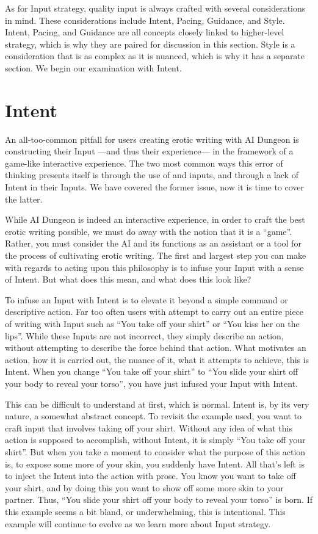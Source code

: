 \documentclass[Source-main.tex]{subfiles}
\begin{document}
As for Input strategy, quality input is always crafted with several considerations in mind.
These considerations include Intent, Pacing, Guidance, and Style.
Intent, Pacing, and Guidance are all concepts closely linked to higher-level strategy, which is why they are paired for discussion in this section.
Style is a consideration that is as complex as it is nuanced, which is why it has a separate section.
We begin our examination with Intent.

\section{Intent}

An all-too-common pitfall for users creating erotic writing with AI Dungeon is constructing their Input —and thus their experience— in the framework of a game-like interactive experience.
The two most common ways this error of thinking presents itself is through the use of  and  inputs, and through a lack of Intent in their Inputs.
We have covered the former issue, now it is time to cover the latter.

While AI Dungeon is indeed an interactive experience, in order to craft the best erotic writing possible, we must do away with the notion that it is a “game”.
Rather, you must consider the AI and its functions as an assistant or a tool for the process of cultivating erotic writing.
The first and largest step you can make with regards to acting upon this philosophy is to infuse your Input with a sense of Intent.
But what does this mean, and what does this look like?

To infuse an Input with Intent is to elevate it beyond a simple command or descriptive action.
Far too often users with attempt to carry out an entire piece of writing with Input such as “You take off your shirt” or “You kiss her on the lips”.
While these Inputs are not incorrect, they simply describe an action, without attempting to describe the force behind that action.
What motivates an action, how it is carried out, the nuance of it, what it attempts to achieve, this is Intent.
When you change “You take off your shirt” to “You slide your shirt off your body to reveal your torso”, you have just infused your Input with Intent.

This can be difficult to understand at first, which is normal.
Intent is, by its very nature, a somewhat abstract concept.
To revisit the example used, you want to craft input that involves taking off your shirt.
Without any idea of what this action is supposed to accomplish, without Intent, it is simply “You take off your shirt”.
But when you take a moment to consider what the purpose of this action is, to expose some more of your skin, you suddenly have Intent.
All that’s left is to inject the Intent into the action with prose.
You know you want to take off your shirt, and by doing this you want to show off some more skin to your partner.
Thus, “You slide your shirt off your body to reveal your torso” is born.
If this example seems a bit bland, or underwhelming, this is intentional.
This example will continue to evolve as we learn more about Input strategy.
\end{document}
